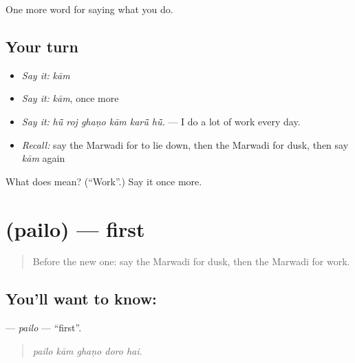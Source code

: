 \begin{grammarlens}[title={What you've built}]
One more word for saying what you do.
\end{grammarlens}

\subsection*{Your turn}
\begin{itemize}
\raggedright
  \item \emph{Say it:} \emph{kām}
  \item \emph{Say it:} \emph{kām}, once more
  \item \emph{Say it:} \emph{hū̃ roj ghaṇo kām karū̃ hū̃.} — I do a lot of work every day.
  \item \emph{Recall:} say the Marwadi for to lie down, then the Marwadi for dusk, then say \emph{kām} again
\end{itemize}

\begin{tcolorbox}[breakable,colback=teal!4,colframe=teal!35!black,title={Before you move on}]
What does  mean? (\textquotedblleft{}Work\textquotedblright{}.) Say it once more.
\end{tcolorbox}
\section[\texorpdfstring{\mw{पैलो} (pailo)}{पैलो (pailo)}]{ (pailo) — first}

\label{lesson:MW-C167-pailo}



\begin{quote}
Before the new one: say the Marwadi for dusk, then the Marwadi for work.
\end{quote}

\subsection*{You'll want to know: }
\textbf{} — \emph{pailo} — \textquotedblleft{}first\textquotedblright{}.

\begin{quote}
    
\end{quote}

\begin{quote}
\emph{pailo kām ghaṇo doro hai.}
\end{quote}

